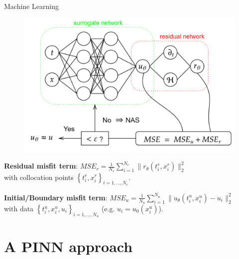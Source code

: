 \documentclass[9pt]{beamer}
\begin{document}
\begin{frame}{Machine Learning}

    \begin{figure}[H]
        \begin{center}
            \includegraphics[scale=0.15]{img/PINN.png}
        \end{center}
    \end{figure}

    \textbf{Residual misfit term}: $MSE_r = \frac{1}{N_r} \sum^{N_r}_{i = 1} \lVert r_\theta \left(t^{r}_i, x^{r}_i\right) \rVert^{2}_{2}$ \\ 
    with collocation points $\left\{t^{r}_i, x^{r}_i \right\}_{i = 1, \ldots, N_r}$. 

    \textbf{Initial/Boundary misfit term}: $MSE_u = \frac{1}{N_u} \sum^{N_u}_{i = 1} \lVert u_\theta\left(t^{u}_i, x^{u}_i\right) - u_i \rVert^{2}_{2}$ \\
    with data $\left\{t^{u}_i, x^{u}_i, u_i \right\}_{i = 1, \ldots, N_u}$ (e.g. $u_i = u_0 \left(x^{u}_i\right)$). 

\end{frame}



\section{A PINN approach}
\end{document}
